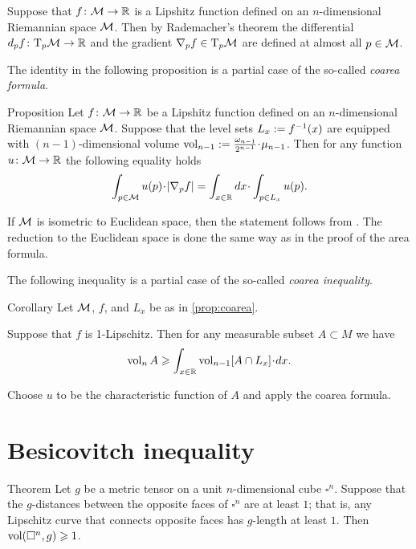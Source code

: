 Suppose that $f\colon\mathcal{M}\to\mathbb{R}$ is a Lipshitz function defined on an $n$-dimensional Riemannian space $\mathcal{M}$.
Then by Rademacher's theorem the differential $d_pf\colon\mathrm{T}_p\mathcal{M}\to\mathbb{R}$  and the gradient 
$\nabla_pf\in\mathrm{T}_p\mathcal{M}$ are defined at almost all $p\in \mathcal{M}$.

The identity in the following proposition is a partial case of the so-called \emph{coarea formula}.


\begin{thm}{Proposition}\label{prop:coarea}
Let $f\colon\mathcal{M}\to\mathbb{R}$ be a Lipshitz function defined on an $n$-dimensional Riemannian space $\mathcal{M}$.
Suppose that the level sets $L_x\mathrel{:=} f^{-1}(x)$ are equipped with $(n-1)$-dimensional volume $\vol_{n-1}\df\tfrac{\omega_{n-1}}{2^{n-1}}\cdot \mu_{n-1}$.
Then for any function $u\colon\mathcal{M}\to \mathbb{R}$ the following equality holds
\[\int_{p\in \spc{M}} u(p)\cdot |\nabla_pf|=\int_{x\in \RR}dx\cdot \int_{p\in L_x} u(p).\]
\end{thm}

If $\mathcal{M}$ is isometric to Euclidean space, then the statement follows from \cite[3.2.12]{federer}.
The reduction to the Euclidean space is done the same way as in the proof of the area formula.
\qeds

The following inequality is a partial case of the so-called  \emph{coarea inequality}.

\begin{thm}{Corollary}\label{cor:coarea}
Let $\mathcal{M}$, $f$, and $L_x$ be as in \ref{prop:coarea}.

Suppose that $f$ is 1-Lipschitz.
Then for any measurable subset $A\subset M$ we have
\[\vol_n A\ge \int_{x\in\RR} \vol_{n-1}[A\cap L_x]\cdot dx.\]
\end{thm}

 Choose $u$ to be the characteristic function of $A$ and apply the coarea formula.
\qeds


\section{Besicovitch inequality}

\begin{thm}{Theorem}\label{thm:besikovitch}
Let $g$ be a metric tensor on a unit $n$-dimensional cube $\square^n$.
Suppose that the $g$-distances between the opposite faces of $\square^n$ are at least $1$; that is, any Lipschitz curve that connects opposite faces has $g$-length at least $1$.
Then $\operatorname{\rm vol}\nolimits(\square^n, g)\geqslant 1$.
\end{thm}


